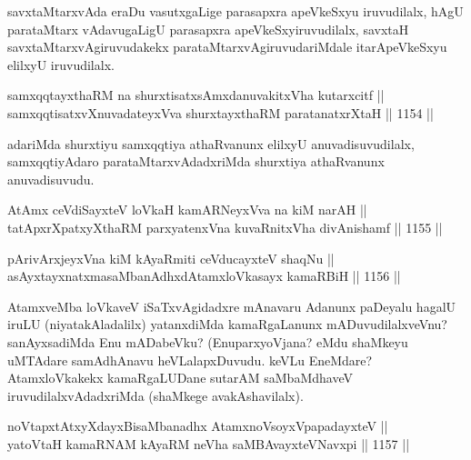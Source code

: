 \begin{artha}
savxtaMtarxvAda eraDu vasutxgaLige parasapxra apeVkeSxyu iruvudilalx, hAgU parataMtarx vAdavugaLigU parasapxra apeVkeSxyiruvudilalx, savxtaH savxtaMtarxvAgiruvudakekx parataMtarxvAgiruvudariMdale itarApeVkeSxyu elilxyU iruvudilalx.
\end{artha}

\begin{shl}
samxqqtayxthaRM na shurxtisatxsAmxdanuvakitxVha kutarxcitf ||  \\
samxqqtisatxvXnuvadateyxVva shurxtayxthaRM paratanatxrXtaH \hfill || 1154 ||  
\end{shl}

\begin{artha}
adariMda shurxtiyu samxqqtiya athaRvanunx elilxyU anuvadisuvudilalx, samxqqtiyAdaro parataMtarxvAdadxriMda shurxtiya athaRvanunx anuvadisuvudu.
\end{artha}



\begin{shl}
AtAmx ceVdiSayxteV loVkaH kamARNeyxVva na kiM narAH || \\
tatApxrXpatxyXthaRM parxyatenxVna kuvaRnitxVha divAnishamf \hfill || 1155 ||  
\end{shl}
				
\begin{shl}
pArivArxjeyxVna kiM kAyaRmiti ceVducayxteV shaqNu || \\
asAyxtayxnatxmasaMbanAdhxdAtamxloVkasayx kamaRBiH \hfill || 1156 ||  
\end{shl}

\begin{artha}
AtamxveMba loVkaveV iSaTxvAgidadxre mAnavaru Adanunx paDeyalu hagalU iruLU (niyatakAladalilx) yatanxdiMda kamaRgaLanunx mADuvudilalxveVnu? sanAyxsadiMda Enu mADabeVku? (EnuparxyoVjana? eMdu shaMkeyu uMTAdare \ndash  samAdhAnavu heVLalapxDuvudu. keVLu EneMdare? AtamxloVkakekx kamaRgaLUDane sutarAM saMbaMdhaveV iruvudilalxvAdadxriMda (shaMkege avakAshavilalx).
\end{artha}


\begin{shl}
noVtapxtAtxyXdayxBisaMbanadhx AtamxnoV\s soyxVpapadayxteV || \\
yatoV\s taH kamaRNAM kAyaRM neVha saMBAvayxteV\s Navxpi \hfill || 1157 ||  
\end{shl}
				
